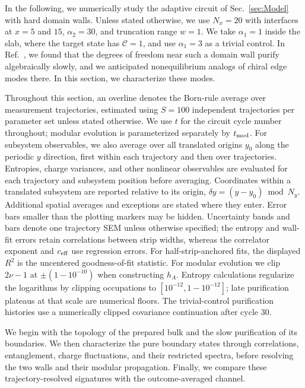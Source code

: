 \documentclass[aps,prb,10pt,twocolumn,superscriptaddress,longbibliography,floatfix]{revtex4-2}
\newcommand{\mc}[1]{\mathcal{#1}}
\begin{document}
In the following, we numerically study the adaptive circuit of Sec.~\ref{sec:Model} with hard domain walls. Unless stated otherwise, we use $N_x=20$ with interfaces at $x=5$ and $15$, $\alpha_2=30$, and truncation range $w=1$. We take $\alpha_1=1$ inside the slab, where the target state has $\mc C=1$, and use $\alpha_1=3$ as a trivial control. In Ref.~\cite{BhuiyanPanJian2026}, we found that the degrees of freedom near such a domain wall purify algebraically slowly, and we anticipated nonequilibrium analogs of chiral edge modes there. In this section, we characterize these modes.
{\color{blue}
Throughout this section, an overline denotes the Born-rule average over measurement trajectories, estimated using $S=100$ independent trajectories per parameter set unless stated otherwise. We use $t$ for the circuit cycle number throughout; modular evolution is parameterized separately by $t_{\rm mod}$. For subsystem observables, we also average over all translated origins $y_0$ along the periodic $y$ direction, first within each trajectory and then over trajectories. Entropies, charge variances, and other nonlinear observables are evaluated for each trajectory and subsystem position before averaging. Coordinates within a translated subsystem are reported relative to its origin, $\delta y=(y-y_0)\bmod N_y$. Additional spatial averages and exceptions are stated where they enter. Error bars smaller than the plotting markers may be hidden. Uncertainty bands and bars denote one trajectory SEM unless otherwise specified; the entropy and wall-fit errors retain correlations between strip widths, whereas the correlator exponent and $c_{\rm eff}$ use regression errors. For half-strip-anchored fits, the displayed $R^2$ is the uncentered goodness-of-fit statistic. For modular evolution we clip $2\nu-1$ at $\pm(1-10^{-10})$ when constructing $h_A$. Entropy calculations regularize the logarithms by clipping occupations to $[10^{-12},1-10^{-12}]$; late purification plateaus at that scale are numerical floors. The trivial-control purification histories use a numerically clipped covariance continuation after cycle 30.

 We begin with the topology of the prepared bulk and the slow purification of its boundaries. We then characterize the pure boundary states through correlations, entanglement, charge fluctuations, and their restricted spectra, before resolving the two walls and their modular propagation. Finally, we compare these trajectory-resolved signatures with the outcome-averaged channel.
}
\end{document}
